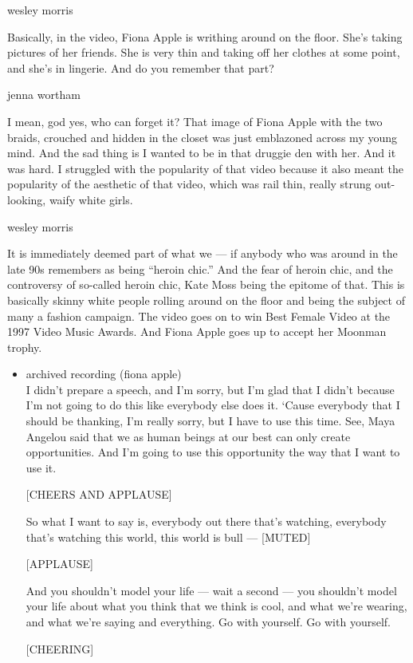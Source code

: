 wesley morris

Basically, in the video, Fiona Apple is writhing around on the floor.
She's taking pictures of her friends. She is very thin and taking off
her clothes at some point, and she's in lingerie. And do you remember
that part?

jenna wortham

I mean, god yes, who can forget it? That image of Fiona Apple with the
two braids, crouched and hidden in the closet was just emblazoned across
my young mind. And the sad thing is I wanted to be in that druggie den
with her. And it was hard. I struggled with the popularity of that video
because it also meant the popularity of the aesthetic of that video,
which was rail thin, really strung out-looking, waify white girls.

wesley morris

It is immediately deemed part of what we --- if anybody who was around
in the late 90s remembers as being ``heroin chic.'' And the fear of
heroin chic, and the controversy of so-called heroin chic, Kate Moss
being the epitome of that. This is basically skinny white people rolling
around on the floor and being the subject of many a fashion campaign.
The video goes on to win Best Female Video at the 1997 Video Music
Awards. And Fiona Apple goes up to accept her Moonman trophy.

\begin{itemize}
\item
  archived recording (fiona apple)\\
  I didn't prepare a speech, and I'm sorry, but I'm glad that I didn't
  because I'm not going to do this like everybody else does it. `Cause
  everybody that I should be thanking, I'm really sorry, but I have to
  use this time. See, Maya Angelou said that we as human beings at our
  best can only create opportunities. And I'm going to use this
  opportunity the way that I want to use it.

  {[}CHEERS AND APPLAUSE{]}

  So what I want to say is, everybody out there that's watching,
  everybody that's watching this world, this world is bull ---
  {[}MUTED{]}

  {[}APPLAUSE{]}

  And you shouldn't model your life --- wait a second --- you shouldn't
  model your life about what you think that we think is cool, and what
  we're wearing, and what we're saying and everything. Go with yourself.
  Go with yourself.

  {[}CHEERING{]}
\end{itemize}

